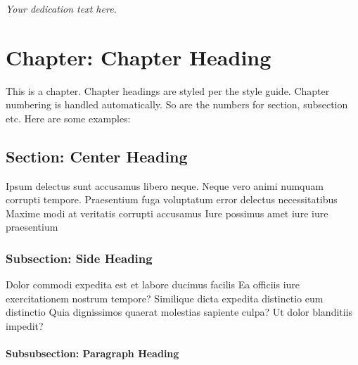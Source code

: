 \documentclass[
    14pt,
    letterpaper,
]{extreport}
\begin{document}
\clearpage

\thispagestyle{empty}

\vspace*{\fill}

\begin{center}
    \textit{Your dedication text here.}
\end{center}

\vspace{\fill}

\clearpage

\begin{abstract}

\blindtext{}

\end{abstract}

\chapter{Chapter: Chapter Heading}

This is a chapter. Chapter headings are styled per the style guide. Chapter
numbering is handled automatically. So are the numbers for section, subsection
etc. Here are some examples:

\section{Section: Center Heading}

Ipsum delectus sunt accusamus libero neque. Neque vero animi numquam corrupti tempore. Praesentium fuga voluptatum error delectus necessitatibus Maxime modi at veritatis corrupti accusamus Iure possimus amet iure iure praesentium

\subsection{Subsection: Side Heading}

Dolor commodi expedita est et labore ducimus facilis Ea officiis iure exercitationem nostrum tempore? Similique dicta expedita distinctio eum distinctio Quia dignissimos quaerat molestias sapiente culpa? Ut dolor blanditiis impedit?

\subsubsection{Subsubsection: Paragraph Heading}
\end{document}
